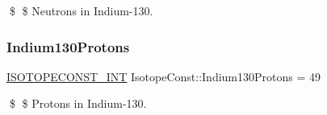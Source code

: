 \$ \$ Neutrons in Indium-\/130. \mbox{\label{group___isotope_const-_indium-_in130_ga06228358873b99e18f033061baa6ea8a}} 
\subsubsection{\texorpdfstring{Indium130\+Protons}{Indium130Protons}}
{\footnotesize\ttfamily \mbox{\hyperlink{group___isotope_const-_macros_ga5f18360b3e99483a35c32d789e62621c}{I\+S\+O\+T\+O\+P\+E\+C\+O\+N\+S\+T\+\_\+\+I\+NT}} Isotope\+Const\+::\+Indium130\+Protons = 49}

\$ \$ Protons in Indium-\/130. 